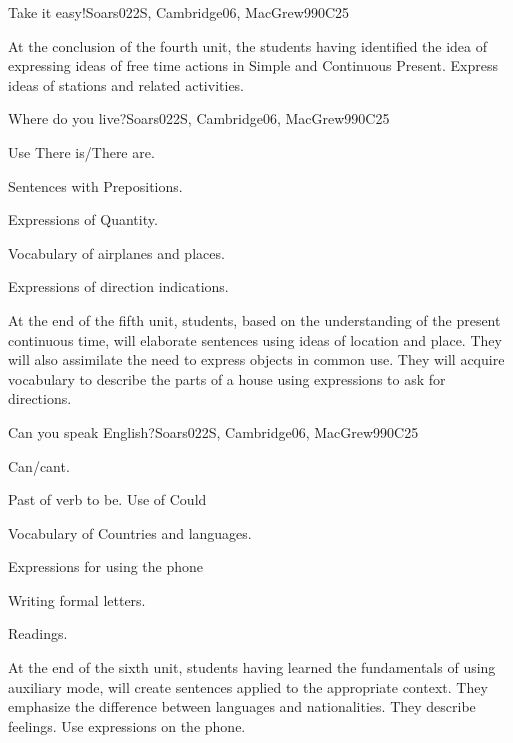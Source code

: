 \begin{syllabus}
\begin{unit}{Take it easy!}{}{Soars022S, Cambridge06, MacGrew99}{0}{C25}
   \begin{learningoutcomes}
      \item At the conclusion of the fourth unit, the students having identified the idea of expressing ideas of free time actions in Simple and Continuous Present. Express ideas of stations and related activities.
   \end{learningoutcomes}

\end{unit}

\begin{unit}{Where do you live?}{}{Soars022S, Cambridge06, MacGrew99}{0}{C25}
   \begin{topics}
      \item Use There is/There are.
      \item Sentences with Prepositions.
      \item Expressions of Quantity.
      \item Vocabulary of airplanes and places.
      \item Expressions of direction indications.
   \end{topics}

   \begin{learningoutcomes}
      \item At the end of the fifth unit, students, based on the understanding of the present continuous time, will elaborate sentences using ideas of location and place. They will also assimilate the need to express objects in common use. They will acquire vocabulary to describe the parts of a house using expressions to ask for directions.
   \end{learningoutcomes}

\end{unit}

\begin{unit}{Can you speak English?}{}{Soars022S, Cambridge06, MacGrew99}{0}{C25}
   \begin{topics}
      \item Can/cant.
      \item Past of verb to be. Use of Could
      \item Vocabulary of Countries and languages.
      \item Expressions for using the phone
      \item Writing formal letters.
      \item Readings.
   \end{topics}

   \begin{learningoutcomes}
      \item At the end of the sixth unit, students having learned the fundamentals of using auxiliary mode, will create sentences applied to the appropriate context. They emphasize the difference between languages and nationalities. They describe feelings. Use expressions on the phone.
   \end{learningoutcomes}


\end{unit}
\end{syllabus}
